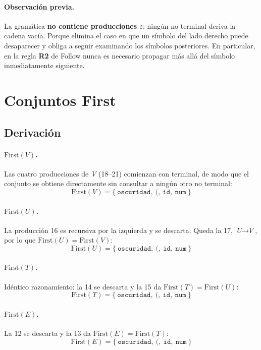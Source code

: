 \documentclass[12pt, letterpaper]{article}
\newcommand{\nt}[1]{\textit{#1}}          %
\newcommand{\tl}[1]{\texttt{#1}}          %
\newcommand{\der}{\ensuremath{\rightarrow}}
\begin{document}
\paragraph{Observación previa.} La gramática \textbf{no contiene
producciones $\varepsilon$}: ningún no terminal deriva la cadena vacía.
Porque elimina el caso en
que un símbolo del lado derecho puede desaparecer y obliga a seguir
examinando los símbolos posteriores. En particular, en la regla
\textbf{R2} de Follow nunca es necesario propagar más allá del símbolo
inmediatamente siguiente.

\section{Conjuntos First}



\subsection{Derivación}

\paragraph{$\mathrm{First}(V)$.} Las cuatro producciones de \nt{V}
(18--21) comienzan con terminal, de modo que el conjunto se obtiene
directamente sin consultar a ningún otro no terminal:
\[
  \mathrm{First}(V) = \{\ \tl{oscuridad},\ \tl{(},\ \tl{id},\ \tl{num}\ \}
\]

\paragraph{$\mathrm{First}(U)$.} La producción 16 es recursiva por la
izquierda y se descarta. Queda la 17, $\nt{U} \der \nt{V}$, por lo que
$\mathrm{First}(U) = \mathrm{First}(V)$:
\[
  \mathrm{First}(U) = \{\ \tl{oscuridad},\ \tl{(},\ \tl{id},\ \tl{num}\ \}
\]

\paragraph{$\mathrm{First}(T)$.} Idéntico razonamiento: la 14 se descarta
y la 15 da $\mathrm{First}(T) = \mathrm{First}(U)$:
\[
  \mathrm{First}(T) = \{\ \tl{oscuridad},\ \tl{(},\ \tl{id},\ \tl{num}\ \}
\]

\paragraph{$\mathrm{First}(E)$.} La 12 se descarta y la 13 da
$\mathrm{First}(E) = \mathrm{First}(T)$:
\[
  \mathrm{First}(E) = \{\ \tl{oscuridad},\ \tl{(},\ \tl{id},\ \tl{num}\ \}
\]
\end{document}
